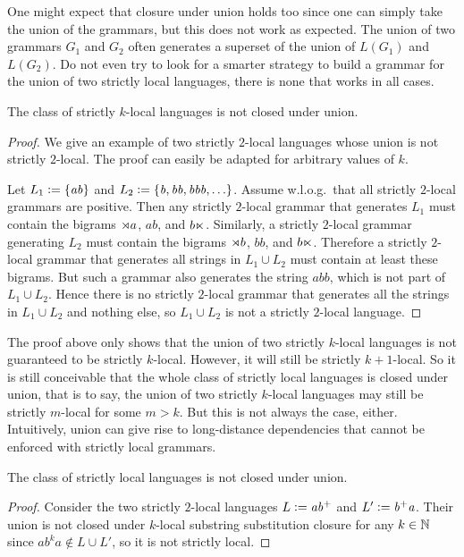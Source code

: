 One might expect that closure under union holds too since one can simply take the union of the grammars, but this does not work as expected.
The union of two grammars $G_1$ and $G_2$ often generates a superset of the union of $L(G_1)$ and $L(G_2)$.
Do not even try to look for a smarter strategy to build a grammar for the union of two strictly local languages, there is none that works in all cases.
%
\begin{lemma}
    The class of strictly $k$-local languages is not closed under union. 
\end{lemma}
%
\begin{proof}
    We give an example of two strictly $2$-local languages whose union is not strictly $2$-local.
    The proof can easily be adapted for arbitrary values of $k$.

    Let $L_1 \mathrel{\mathop:}= \left \{ \mathit{ab} \right \}$ and $L_2 \mathrel{\mathop:}= \left \{ \mathit{b}, \mathit{bb}, \mathit{bbb}, \ldots \right \}$.
    Assume w.l.o.g.\ that all strictly $2$-local grammars are positive.
    Then any strictly $2$-local grammar that generates $L_1$ must contain the bigrams $\rtimes a$, $\mathit{ab}$, and $b \ltimes$.
    Similarly, a strictly $2$-local grammar generating $L_2$ must contain the bigrams $\rtimes b$, $\mathit{bb}$, and $b \ltimes$.
    Therefore a strictly $2$-local grammar that generates all strings in $L_1 \cup L_2$ must contain at least these bigrams.
    But such a grammar also generates the string $\mathit{abb}$, which is not part of $L_1 \cup L_2$.
    Hence there is no strictly $2$-local grammar that generates all the strings in $L_1 \cup L_2$ and nothing else, so $L_1 \cup L_2$ is not a strictly $2$-local language.
\end{proof}
%
The proof above only shows that the union of two strictly $k$-local languages is not guaranteed to be strictly $k$-local.
However, it will still be strictly $k+1$-local.
So it is still conceivable that the whole class of strictly local languages is closed under union, that is to say, the union of two strictly $k$-local languages may still be strictly $m$-local for some $m > k$.
But this is not always the case, either.
Intuitively, union can give rise to long-distance dependencies that cannot be enforced with strictly local grammars.
%
\begin{lemma}
    The class of strictly local languages is not closed under union.
\end{lemma}
%
\begin{proof}
    Consider the two strictly $2$-local languages $L \mathrel{\mathop:}= \mathit{ab^+}$ and $L' \mathrel{\mathop:}= \mathit{b^+ a}$.
    Their union is not closed under $k$-local substring substitution closure for any $k \in \mathbb{N}$ since $a b^k a \notin L \cup L'$, so it is not strictly local.
\end{proof}

